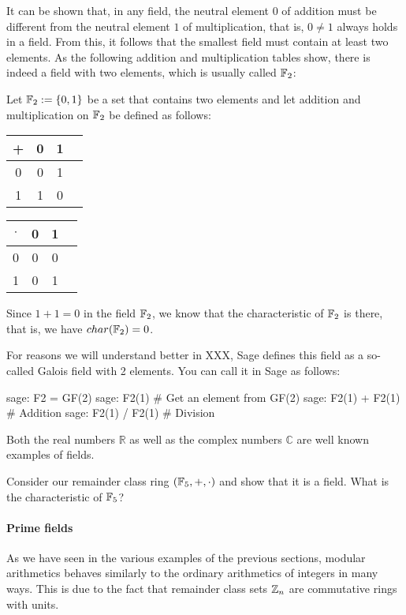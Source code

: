 \begin{example}\label{ex:field-2-elements} It can be shown that, in any field, the neutral element $0$ of addition must be different from the neutral element $1$ of multiplication, that is, $0\neq 1$ always holds in a field. From this, it follows that the smallest field must contain at least two elements. As the following addition and multiplication tables show, there is indeed a field with two elements, which is usually called $\mathbb{F}_2$:

Let $\mathbb{F}_2:=\{0,1 \}$ be a set that contains two elements and let addition and multiplication on $\mathbb{F}_2$ be defined as follows:
\begin{center}
  \begin{tabular}{c | c c c}
    + & 0 & 1 \\\hline
    0 & 0 & 1\\
    1 & 1 & 0 \\
  \end{tabular} \quad \quad \quad \quad
  \begin{tabular}{c | c c c}
$\cdot$ & 0 & 1 \\\hline
      0 & 0 & 0 \\
      1 & 0 & 1 \\
  \end{tabular}
\end{center}
Since $1+1=0$ in the field $\mathbb{F}_2$, we know that the characteristic of $\mathbb{F}_2$ is there, that is, we have $char(\mathbb{F}_2)=0$.

For reasons we will understand better in XXX, Sage defines this field as a so-called Galois field with 2 elements. You can call it in Sage as follows:
\begin{sagecommandline}
sage: F2 = GF(2)
sage: F2(1) # Get an element from GF(2)
sage: F2(1) + F2(1) # Addition
sage: F2(1) / F2(1) # Division
\end{sagecommandline}
\end{example}
\begin{example}
Both the real numbers $\mathbb{R}$ as well as the complex numbers $\mathbb{C}$ are well known examples of fields.
\end{example}
\begin{exercise}
Consider our remainder class ring $(\mathbb{F}_5,+,\cdot)$ and show that it is a field. What is the characteristic of $\mathbb{F}_5$?
\end{exercise}
\paragraph{Prime fields}
As we have seen in the various examples of the previous sections, modular arithmetics behaves similarly to the ordinary arithmetics of integers  in many ways. This is due to the fact that remainder class sets $\mathbb{Z}_n$ are commutative rings with units.

